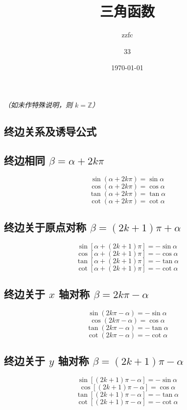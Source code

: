 \documentclass[a4paper, fleqn]{ctexart}
\begin{document}
	\title{三角函数}
	\author{zzfc
		\and 33}
	\date{\today}
	\maketitle
	\begin{center}
		\emph{（如未作特殊说明，则 $k = \mathbb{Z}$）} \par
	\end{center} 
	\begin{multicols}{2}
	\section{终边关系及诱导公式}
		\subsection{终边相同 $\beta = \alpha + 2k\pi$}
		\[\sin\left(\alpha+2k\pi\right)=\sin\alpha\]
		\[\cos\left(\alpha+2k\pi\right)=\cos\alpha\]
		\[\tan\left(\alpha+2k\pi\right)=\tan\alpha\]
		\[\cot\left(\alpha+2k\pi\right)=\cot\alpha\]
		
		\subsection{终边关于原点对称 $\beta = (2k+1)\pi+\alpha$}
		\[\sin\left[\alpha+\left(2k+1\right)\pi\right]=-\sin\alpha\]
		\[\cos\left[\alpha+\left(2k+1\right)\pi\right]=-\cos\alpha\]
		\[\tan\left[\alpha+\left(2k+1\right)\pi\right]=-\tan\alpha\]
		\[\cot\left[\alpha+\left(2k+1\right)\pi\right]=-\cot\alpha\]
		
		\subsection{终边关于 $ x $ 轴对称 $\beta = 2k \pi - \alpha$}
		\[ \sin\left(2k\pi-\alpha\right)=-\sin\alpha \]
		\[ \cos\left(2k\pi-\alpha\right)=\cos\alpha \]
		\[ \tan\left(2k\pi-\alpha\right)=-\tan\alpha \]
		\[ \cot\left(2k\pi-\alpha\right)=-\cot\alpha \]
		
		\subsection{终边关于 $ y $ 轴对称 $\beta=(2k+1)\pi-\alpha$}
		\[ \sin\left[\left(2k+1\right)\pi-\alpha\right]=-\sin\alpha \]
		\[ \cos\left[\left(2k+1\right)\pi-\alpha\right]=\cos\alpha \]
		\[ \tan\left[\left(2k+1\right)\pi-\alpha\right]=-\tan\alpha \]
		\[ \cot\left[\left(2k+1\right)\pi-\alpha\right]=-\cot\alpha \]


\end{multicols}
\end{document}
